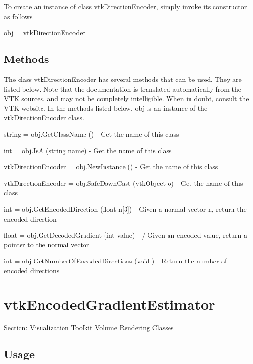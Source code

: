 To create an instance of class vtk\-Direction\-Encoder, simply invoke its constructor as follows \begin{DoxyVerb}  obj = vtkDirectionEncoder
\end{DoxyVerb}
 \hypertarget{vtkwidgets_vtkxyplotwidget_Methods}{}\subsection{Methods}\label{vtkwidgets_vtkxyplotwidget_Methods}
The class vtk\-Direction\-Encoder has several methods that can be used. They are listed below. Note that the documentation is translated automatically from the V\-T\-K sources, and may not be completely intelligible. When in doubt, consult the V\-T\-K website. In the methods listed below, {\ttfamily obj} is an instance of the vtk\-Direction\-Encoder class. 
\begin{DoxyItemize}
\item {\ttfamily string = obj.\-Get\-Class\-Name ()} -\/ Get the name of this class  
\item {\ttfamily int = obj.\-Is\-A (string name)} -\/ Get the name of this class  
\item {\ttfamily vtk\-Direction\-Encoder = obj.\-New\-Instance ()} -\/ Get the name of this class  
\item {\ttfamily vtk\-Direction\-Encoder = obj.\-Safe\-Down\-Cast (vtk\-Object o)} -\/ Get the name of this class  
\item {\ttfamily int = obj.\-Get\-Encoded\-Direction (float n\mbox{[}3\mbox{]})} -\/ Given a normal vector n, return the encoded direction  
\item {\ttfamily float = obj.\-Get\-Decoded\-Gradient (int value)} -\/ / Given an encoded value, return a pointer to the normal vector  
\item {\ttfamily int = obj.\-Get\-Number\-Of\-Encoded\-Directions (void )} -\/ Return the number of encoded directions  
\end{DoxyItemize}\hypertarget{vtkvolumerendering_vtkencodedgradientestimator}{}\section{vtk\-Encoded\-Gradient\-Estimator}\label{vtkvolumerendering_vtkencodedgradientestimator}
Section\-: \hyperlink{sec_vtkvolumerendering}{Visualization Toolkit Volume Rendering Classes} \hypertarget{vtkwidgets_vtkxyplotwidget_Usage}{}\subsection{Usage}\label{vtkwidgets_vtkxyplotwidget_Usage}
